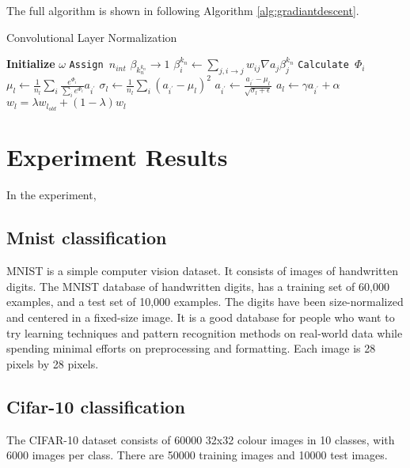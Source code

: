 \documentclass{sig-alternate}
\begin{document}
    The full algorithm is shown in following Algorithm \ref{alg:gradiantdescent}.

    \begin{algorithm}
        \caption{Convolutional Layer Normalization}\label{alg:gradiantdescent}
        \begin {algorithmic}[1]
            \STATE \textbf{Initialize} $\omega$
            \STATE \texttt{Assign $n_{int}$}
            \STATE $\beta_k_n^{k_n} \rightarrow 1$
                \STATE \texttt{$\beta_{i}^{k_n} \leftarrow \sum_{j, i\rightarrow j}w_{ij}\nabla a_j \beta_j^{k_n}$}
                \STATE \texttt{Calculate $\Phi_{i}$}
            \ENDFOR
            \STATE \texttt{$\mu_l \leftarrow \frac{1}{n_{l}}\sum_i \frac{e^{\Phi_i}}{\sum_i e^{\Phi_i}}a_{i^{'}}$}
            \STATE \texttt{$\sigma_l \leftarrow \frac{1}{n_l}\sum_i (a_{i^{'}}-\mu_l)^{2}$}
            \STATE \texttt{$a_{i^{'}}\leftarrow \frac{a_{i^{'}}-\mu_l}{\sqrt{\sigma_l+\epsilon}}$}
            \STATE \texttt{$a_l \leftarrow \gamma a_{i^{'}} + \alpha$}
                \STATE \texttt{$w_l = \lambda w_{l_{old}} + (1-\lambda)w_l$}
            \ENDWHILE
            
        \end{algorithmic}
        
    \end{algorithm}

\section{Experiment Results}
    In the experiment, 
    \subsection{Mnist classification}
    MNIST is a simple computer vision dataset. It consists of images of handwritten digits. The MNIST database of handwritten digits, has a training set of 60,000 examples, and a test set of 10,000 examples. The digits have been size-normalized and centered in a fixed-size image. It is a good database for people who want to try learning techniques and pattern recognition methods on real-world data while spending minimal efforts on preprocessing and formatting. Each image is 28 pixels by 28 pixels.
    
    \subsection{Cifar-10 classification}
    The CIFAR-10 dataset consists of 60000 32x32 colour images in 10 classes, with 6000 images per class. There are 50000 training images and 10000 test images. 
\end{document}
